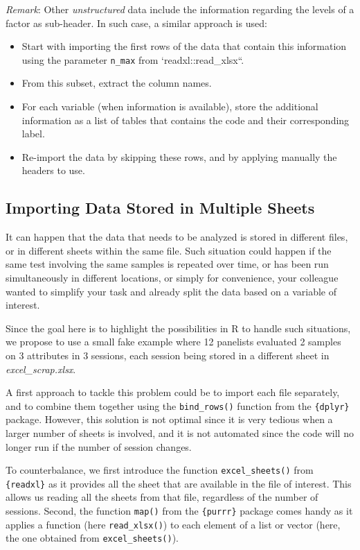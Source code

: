 \documentclass[
]{book}
\providecommand{\tightlist}{%
  \setlength{\itemsep}{0pt}\setlength{\parskip}{0pt}}
\begin{document}
\emph{Remark}: Other \emph{unstructured} data include the information regarding the levels of a factor as sub-header. In such case, a similar approach is used:

\begin{itemize}
\tightlist
\item
  Start with importing the first rows of the data that contain this information using the parameter \texttt{n\_max} from `readxl::read\_xlsx``.
\item
  From this subset, extract the column names.
\item
  For each variable (when information is available), store the additional information as a list of tables that contains the code and their corresponding label.
\item
  Re-import the data by skipping these rows, and by applying manually the headers to use.
\end{itemize}

\hypertarget{import-mult-sheet}{%
\subsection{Importing Data Stored in Multiple Sheets}\label{import-mult-sheet}}

It can happen that the data that needs to be analyzed is stored in different files, or in different sheets within the same file. Such situation could happen if the same test involving the same samples is repeated over time, or has been run simultaneously in different locations, or simply for convenience, your colleague wanted to simplify your task and already split the data based on a variable of interest.

Since the goal here is to highlight the possibilities in R to handle such situations, we propose to use a small fake example where 12 panelists evaluated 2 samples on 3 attributes in 3 sessions, each session being stored in a different sheet in \emph{excel\_scrap.xlsx}.

A first approach to tackle this problem could be to import each file separately, and to combine them together using the \texttt{bind\_rows()} function from the \texttt{\{dplyr\}} package. However, this solution is not optimal since it is very tedious when a larger number of sheets is involved, and it is not automated since the code will no longer run if the number of session changes.

To counterbalance, we first introduce the function \texttt{excel\_sheets()} from \texttt{\{readxl\}} as it provides all the sheet that are available in the file of interest. This allows us reading all the sheets from that file, regardless of the number of sessions. Second, the function \texttt{map()} from the \texttt{\{purrr\}} package comes handy as it applies a function (here \texttt{read\_xlsx()}) to each element of a list or vector (here, the one obtained from \texttt{excel\_sheets()}).
\end{document}
